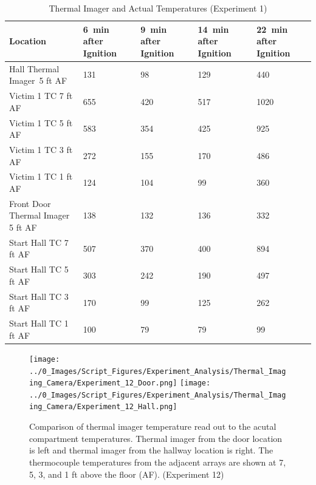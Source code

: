 \documentclass[12pt,oneside]{book}
\begin{document}
\begin{table}[H]
\centering
\begin{tabular}{|L{0.25\textwidth}|C{0.15\textwidth}|C{0.15\textwidth}|C{0.15\textwidth}|C{0.15\textwidth}|}
\hline
Location	                    &6~min after Ignition	&9~min after Ignition	&14~min after Ignition	&22~min after Ignition \\ \hline \hline
Hall Thermal Imager~5 ft AF 	&131	&98	    &129	&440	\\ \hline
Victim 1 TC 7 ft AF				&655	&420	&517	&1020	\\ \hline
Victim 1 TC 5 ft AF				&583	&354	&425	&925	\\ \hline
Victim 1 TC 3 ft AF				&272	&155	&170	&486	\\ \hline
Victim 1 TC 1 ft AF				&124	&104	&99		&360 	\\ \hline
Front Door Thermal Imager 5 ft AF &138	&132	&136	&332	\\ \hline
Start Hall TC 7 ft AF			&507	&370	&400	&894	\\ \hline
Start Hall TC 5 ft AF			&303	&242	&190	&497	\\ \hline
Start Hall TC 3 ft AF			&170	&99		&125	&262	\\ \hline
Start Hall TC 1 ft AF			&100	&79		&79		&99		\\ \hline
\end{tabular}
\caption{Thermal Imager and Actual Temperatures (Experiment 1)}
\label{table:hall_thermal_imager_1}
\end{table}

\begin{figure}[H]
\centering
\texttt{[image: ../0\_Images/Script\_Figures/Experiment\_Analysis/Thermal\_Imaging\_Camera/Experiment\_12\_Door.png]}
\texttt{[image: ../0\_Images/Script\_Figures/Experiment\_Analysis/Thermal\_Imaging\_Camera/Experiment\_12\_Hall.png]}
\caption[Thermal Imager H]{Comparison of thermal imager temperature read out to the acutal compartment temperatures. Thermal imager from the door location is left and thermal imager from the hallway location is right. The thermocouple temperatures from the adjacent arrays are shown at 7, 5, 3, and 1 ft above the floor (AF). (Experiment 12)}
\label{fig:thermal_imager_h}
\end{figure}
\end{document}
